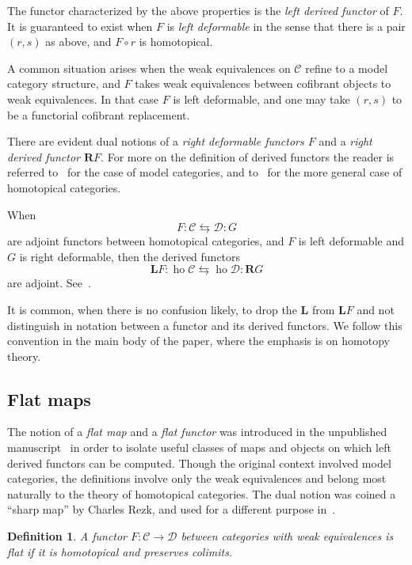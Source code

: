 \documentclass{amsart}
\newtheorem{definition}[equation]{Definition}
\newenvironment{defin}{\begin{definition}\rm}{\end{definition}}
\theoremstyle{definition}
\newtheorem{defin}[equation]{Definition}
\theoremstyle{remark}
\DeclareMathOperator{\ho}{ho}
\newcommand{\cat}[1]{{\mathcal #1}}
\newcommand{\lder}{\mathbf{L}}
\newcommand{\rder}{\mathbf{R}}
\begin{document}
The functor characterized by the above properties is the {\em left
derived functor} of $F$.  It is guaranteed to exist when $F$ is {\em
left deformable} in the sense that there is a pair $(r,s)$ as above,
and $F\circ r$ is homotopical.

A common situation arises when the weak equivalences on $\cat C$
refine to a model category structure, and $F$ takes weak equivalences
between cofibrant objects to weak equivalences.  In that case $F$ is
left deformable, and one may take $(r,s)$ to be a functorial cofibrant
replacement.

There are evident dual notions of a {\em right deformable functors $F$}
and a {\em right derived functor $\rder F$}.  For more on the
definition of derived functors the reader is referred to~\cite{Qui:HA}
for the case of model categories, and
to~\cite[Chapter~VII]{dwyer04:_homot} for the more general case of
homotopical categories.

When
\[
F:\cat C\leftrightarrows \cat D:G
\]
are adjoint functors between homotopical categories, and $F$ is left
deformable and $G$ is right deformable, then the derived functors 
\[
\lder F:\ho\cat C\leftrightarrows\ho\cat D:\rder G
\]
are adjoint.   See~\cite[Chapter~VII, \S44]{dwyer04:_homot}.


It is common, when there is no confusion likely, to drop the $\lder$
from $\lder F$ and not distinguish in notation between a functor and
its derived functors.   We follow this convention in the main body of
the paper, where the emphasis is on homotopy theory.

\subsection{Flat maps} \label{sec:flat-maps} 
The notion of a {\em flat map} and a {\em flat functor} was introduced
in the unpublished manuscript~\cite{HopGoerss:Mult} in order to
isolate useful classes of maps and objects on which left derived
functors can be computed.  Though the original context involved model
categories, the definitions involve only the weak equivalences and
belong most naturally to the theory of homotopical categories.  The
dual notion was coined a ``sharp map'' by Charles Rezk, and used for a
different purpose
in~\cite{rezk:_fibrat_and_homot_colim_of_simpl_sheav}.


\begin{defin}
\label{def:45} A functor $F:\cat C\to \cat D$ between categories with
weak equivalences is {\em flat} if it is homotopical and preserves
colimits.
\end{defin}
\end{document}
